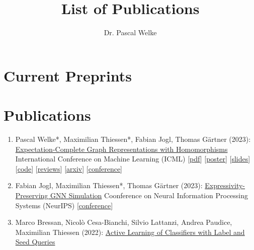 \documentclass{scrartcl}
\author{Dr. Pascal Welke}
\title{List of Publications}
\begin{document}
\setcounter{saveenumi}{0}
\newcommand{\seti}{\setcounter{saveenumi}{\value{enumi}}}
\newcommand{\conti}{\setcounter{enumi}{\value{saveenumi}}}


\section{Current Preprints}
\begin{enumerate}
\conti
\makeatletter\let\@noitemerr\relax\makeatother
\seti
\end{enumerate}

\section{Publications}
\begin{enumerate}
\conti
\item
\label{welke2023expectation}
Pascal Welke*, Maximilian Thiessen*, Fabian Jogl, Thomas Gärtner (2023):\newline
\href{https://proceedings.mlr.press/v202/welke23a.html}{Expectation-Complete Graph Representations with Homomorphisms}\newline
International Conference on Machine Learning (ICML)\newline
{\footnotesize
[\href{https://pwelke.github.io/publications/welkethiessen2023expectationcomplete.pdf}{pdf}]
[\href{https://pwelke.github.io/publications/expectation_complete_poster_ICML.pdf}{poster}]
[\href{https://pwelke.github.io/publications/expectation_complete_slides_ICML.pdf}{slides}]
[\href{https://github.com/pwelke/homcount}{code}]
[\href{https://openreview.net/forum?id=ppgRPC14uI}{reviews}]
[\href{https://arxiv.org/abs/2306.05838}{arxiv}]
[\href{https://icml.cc/2023}{conference}]
}
\item
\label{jogl2023expressivity}
Fabian Jogl, Maximilian Thiessen*, Thomas Gärtner (2023):\newline
\href{https://pwelke.github.io/}{Expressivity-Preserving GNN Simulation}\newline
Coonference on Neural Information Processing Systems (NeurIPS)\newline
{\footnotesize
[\href{https://pwelke.github.io/}{conference}]
}
\item
\label{bressan2022active}
Marco Bressan, Nicolò Cesa-Bianchi, Silvio Lattanzi, Andrea Paudice, Maximilian Thiessen (2022):\newline
\href{https://pwelke.github.io/}{Active Learning of Classifiers with Label and Seed Queries}\newline

\end{enumerate}
\end{document}
